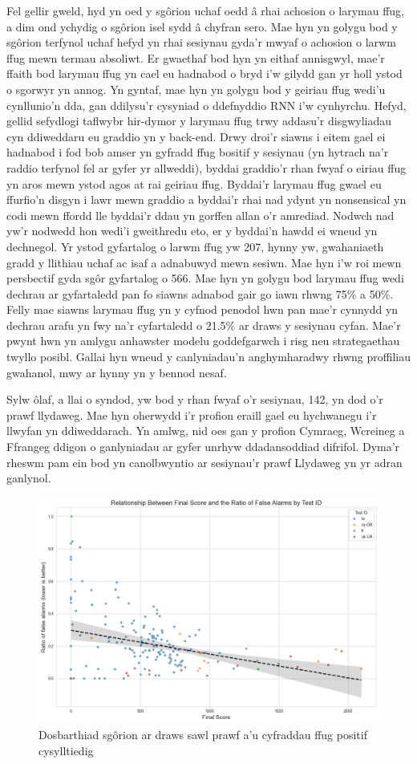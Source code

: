 Fel gellir gweld, hyd yn oed y sgôrion uchaf oedd â rhai achosion o larymau ffug, a dim ond ychydig o sgôrion isel sydd â chyfran sero. Mae hyn yn golygu bod y sgôrion terfynol uchaf hefyd yn rhai sesiynau gyda'r mwyaf o achosion o larwm ffug mewn termau absoliwt. Er gwaethaf bod hyn yn eithaf annisgwyl, mae'r ffaith bod larymau ffug yn cael eu hadnabod o bryd i'w gilydd gan yr holl ystod o sgorwyr yn annog. Yn gyntaf, mae hyn yn golygu bod y geiriau ffug wedi'u cynllunio'n dda, gan ddilysu'r cysyniad o ddefnyddio RNN i'w cynhyrchu. Hefyd, gellid sefydlogi taflwybr hir-dymor y larymau ffug trwy addasu'r disgwyliadau cyn ddiweddaru eu graddio yn y back-end. Drwy droi'r siawns i eitem gael ei hadnabod i fod bob amser yn gyfradd ffug bositif y sesiynau (yn hytrach na'r raddio terfynol fel ar gyfer yr allweddi), byddai graddio'r rhan fwyaf o eiriau ffug yn aros mewn ystod agos at rai geiriau ffug. Byddai'r larymau ffug gwael eu ffurfio'n disgyn i lawr mewn graddio a byddai'r rhai nad ydynt yn nonsensical yn codi mewn ffordd lle byddai'r ddau yn gorffen allan o'r amrediad. Nodwch nad yw'r nodwedd hon wedi'i gweithredu eto, er y byddai'n hawdd ei wneud yn dechnegol. Yr ystod gyfartalog o larwm ffug yw 207, hynny yw, gwahaniaeth gradd y llithiau uchaf ac isaf a adnabuwyd mewn sesiwn. Mae hyn i'w roi mewn persbectif gyda sgôr gyfartalog o 566. Mae hyn yn golygu bod larymau ffug wedi dechrau ar gyfartaledd pan fo siawns adnabod gair go iawn rhwng 75\% a 50\%. Felly mae siawns larymau ffug yn y cyfnod penodol hwn pan mae'r cynnydd yn dechrau arafu yn fwy na'r cyfartaledd o 21.5\% ar draws y sesiynau cyfan. Mae'r pwynt hwn yn amlygu anhawster modelu goddefgarwch i risg neu strategaethau twyllo posibl. Gallai hyn wneud y canlyniadau'n anghymharadwy rhwng proffiliau gwahanol, mwy ar hynny yn y bennod nesaf.

Sylw ôlaf, a llai o syndod, yw bod y rhan fwyaf o'r sesiynau, 142, yn dod o'r prawf llydaweg. Mae hyn oherwydd i'r profion eraill gael eu hychwanegu i'r llwyfan yn ddiweddarach. Yn amlwg, nid oes gan y profion Cymraeg, Wcreineg a Ffrangeg ddigon o ganlyniadau ar gyfer unrhyw ddadansoddiad difrifol. Dyma'r rheswm pam ein bod yn canolbwyntio ar sesiynau'r prawf Llydaweg yn yr adran ganlynol.

\begin{figure}
    \centering
    \includegraphics[width=0.8\linewidth]{figures/scores-fa.png}
    \caption{Dosbarthiad sgôrion ar draws sawl prawf a'u cyfraddau ffug positif cysylltiedig}
    \medskip
    \small
\end{figure}\label{fig:score-fa}

